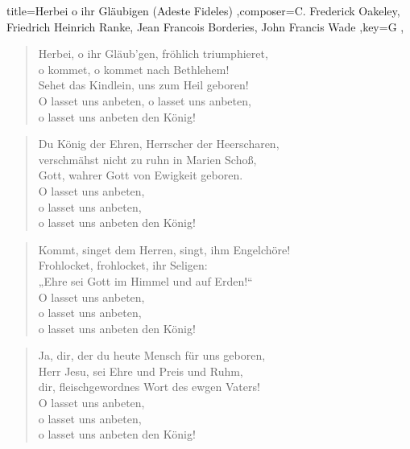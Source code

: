 \documentclass[]{leadsheet}
\begin{document}
\begin{song}{title={Herbei o ihr Gläubigen (Adeste Fideles)
},composer={C. Frederick Oakeley, Friedrich Heinrich Ranke, Jean Francois Borderies, John Francis Wade
},key={G
},}
\begin{verse}
Herbei, o ihr Gläub'gen, fröhlich triumphieret, \\
o kommet, o kommet nach Bethlehem! \\
Sehet das Kindlein, uns zum Heil geboren! \\
O lasset uns anbeten, o lasset uns anbeten, \\
o lasset uns anbeten den König! \\
\end{verse}

\begin{verse}
Du König der Ehren, Herrscher der Heerscharen, \\
verschmähst nicht zu ruhn in Marien Schoß, \\
Gott, wahrer Gott von Ewigkeit geboren. \\
O lasset uns anbeten, \\
o lasset uns anbeten, \\
o lasset uns anbeten den König! \\
\end{verse}

\begin{verse}
Kommt, singet dem Herren, singt, ihm Engelchöre! \\
Frohlocket, frohlocket, ihr Seligen: \\
„Ehre sei Gott im Himmel und auf Erden!“ \\
O lasset uns anbeten, \\
o lasset uns anbeten, \\
o lasset uns anbeten den König! \\
\end{verse}

\begin{verse}
Ja, dir, der du heute Mensch für uns geboren, \\
Herr Jesu, sei Ehre und Preis und Ruhm, \\
dir, fleischgewordnes Wort des ewgen Vaters! \\
O lasset uns anbeten, \\
o lasset uns anbeten, \\
o lasset uns anbeten den König! \\
\end{verse}

\end{song}
\end{document}
